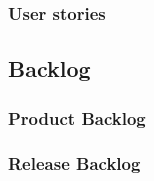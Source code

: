 \begin{frame}
	\begin{center}
		\frametitle{User stories}
	\end{center}
\end{frame}

\subsection{Backlog}

\begin{frame}
	\begin{center}
		\frametitle{Product Backlog}
	\end{center}
\end{frame}

\begin{frame}
	\begin{center}
		\frametitle{Release Backlog}
	\end{center}
\end{frame}
